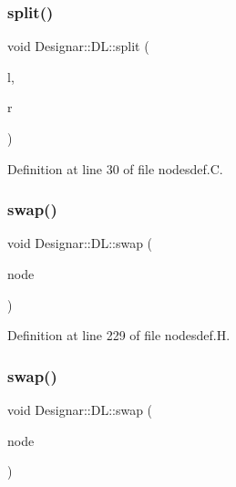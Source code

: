 \mbox{\label{class_designar_1_1_d_l_a81ed81ffd61fde1419fb4fb87ba551e3}} 
\subsubsection{\texorpdfstring{split()}{split()}}
{\footnotesize\ttfamily void Designar\+::\+D\+L\+::split (\begin{DoxyParamCaption}\item[{\hyperlink{class_designar_1_1_d_l}{DL} \&}]{l,  }\item[{\hyperlink{class_designar_1_1_d_l}{DL} \&}]{r }\end{DoxyParamCaption})}



Definition at line 30 of file nodesdef.\+C.

\mbox{\label{class_designar_1_1_d_l_a3a6b3f9fe3da01008ebf5f60bdf20bbc}} 
\subsubsection{\texorpdfstring{swap()}{swap()}\hspace{0.1cm}{\footnotesize\ttfamily [1/2]}}
{\footnotesize\ttfamily void Designar\+::\+D\+L\+::swap (\begin{DoxyParamCaption}\item[{\hyperlink{class_designar_1_1_d_l}{DL} $\ast$}]{node }\end{DoxyParamCaption})\hspace{0.3cm}{\ttfamily [inline]}}



Definition at line 229 of file nodesdef.\+H.

\mbox{\label{class_designar_1_1_d_l_a7b32539230a7ce8c23a8439bac4f3a12}} 
\subsubsection{\texorpdfstring{swap()}{swap()}\hspace{0.1cm}{\footnotesize\ttfamily [2/2]}}
{\footnotesize\ttfamily void Designar\+::\+D\+L\+::swap (\begin{DoxyParamCaption}\item[{\hyperlink{class_designar_1_1_d_l}{DL} \&}]{node }\end{DoxyParamCaption})\hspace{0.3cm}{\ttfamily [inline]}}




